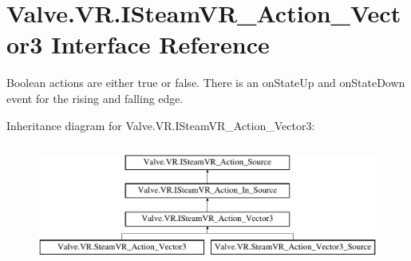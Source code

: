 \hypertarget{interface_valve_1_1_v_r_1_1_i_steam_v_r___action___vector3}{}\section{Valve.\+V\+R.\+I\+Steam\+V\+R\+\_\+\+Action\+\_\+\+Vector3 Interface Reference}
\label{interface_valve_1_1_v_r_1_1_i_steam_v_r___action___vector3}


Boolean actions are either true or false. There is an on\+State\+Up and on\+State\+Down event for the rising and falling edge.  


Inheritance diagram for Valve.\+V\+R.\+I\+Steam\+V\+R\+\_\+\+Action\+\_\+\+Vector3\+:\begin{figure}[H]
\begin{center}
\leavevmode
\includegraphics[height=4.000000cm]{interface_valve_1_1_v_r_1_1_i_steam_v_r___action___vector3}
\end{center}
\end{figure}
